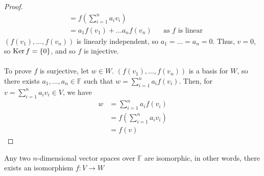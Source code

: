 \documentclass[letterpaper,12pt]{article}
\begin{document}
\begin{proof}
\begin{align*}
    & = f\left(\sum_{i=1}^n a_i v_i \right) \\
    & = a_1 f(v_1) + \dots a_n f(v_n) && \text{as $f$ is linear}
\end{align*}
$(f(v_1), \dots, f(v_n))$ is linearly independent, so $a_1 = \dots = a_n = 0$. Thus, $v = 0$, so $\operatorname{Ker}{f} = \left\{ 0 \right\}$, and so $f$ is injective.
\\ \\ To prove $f$ is surjective, let $w \in W$. $(f(v_1), \dots, f(v_n))$ is a basis for $W$, so there exists $a_1, \dots, a_n \in \mathbb{F}$ such that $w = \sum_{i=1}^n a_i f(v_i)$. Then, for $v = \sum_{i=1}^n a_i v_i \in V$, we have
\begin{align*}
    w & = \sum_{i=1}^n a_i f(v_i) \\
    & = f\left(\sum_{i=1}^n a_i v_i \right) \\
    & = f(v)
\end{align*}
\end{proof}

\begin{corollary}
Any two $n$-dimensional vector spaces over $\mathbb{F}$ are isomorphic, in other words, there exists an isomorphism $f: V \rightarrow W$
\end{corollary}
\end{document}
